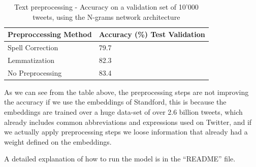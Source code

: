 \documentclass[10pt,conference,compsocconf]{IEEEtran}
\begin{document}
\begin{table}[H]
  \caption{Text preprocessing - Accuracy on a validation set of 10'000 tweets, using the N-grams network architecture}
   \label{tab:models_pre_processing}
\begin{tabular}{|l|l|}
\hline
\textbf{Preproccessing Method} & \textbf{Accuracy (\%) Test Validation} \\ \hline
Spell Correction & 79.7 \\ \hline
Lemmatization & 82.3\\ \hline
No Preprocessing & 83.4 \\ \hline
\end{tabular}
\end{table}
As we can see from the table above, the preprocessing steps are not improving the accuracy if we use the embeddings of Standford, this is because the embeddings are trained over a huge data-set of over 2.6 billion tweets, which already includes common abbreviations and expressions used on Twitter, and if we actually apply preprocessing steps we loose information that already had a weight defined on the embeddings.

A detailed explanation of how to run the model is in the ``README'' file.



\end{document}

